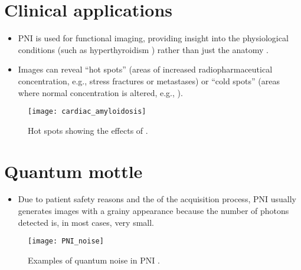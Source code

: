 \section{Clinical applications}
\begin{itemize}
\item PNI is used for functional imaging, providing insight into the
  physiological conditions (such as hyperthyroidism
  \cite{abdulla2025molecular_imaging}) rather than just the anatomy
  \cite{bushberg2011essential}.
\item Images can reveal ``hot spots'' (areas of increased
  radiopharmaceutical concentration, e.g., stress fractures or
  metastases) or ``cold spots'' (areas where normal concentration is
  altered, e.g., ).
\end{itemize}
\vspace{-1ex}
\begin{figure}[H]
  \centering
  \texttt{[image: cardiac\_amyloidosis]}
  \caption{Hot spots showing the effects of 
    \cite{MNT_effects_cardiac_amyloidosis}.\label{fig:hot_spots}}
\end{figure}

\section{Quantum mottle}
\begin{itemize}
\item Due to patient safety reasons and the  of the
  acquisition process, PNI usually generates images with a grainy
  appearance because the number of photons detected is, in most cases,
  very small.
\end{itemize}
\vspace{-1ex}
\begin{figure}[H]
  \centering
  \texttt{[image: PNI\_noise]}
  \caption{Examples of quantum noise in \gls{PNI}
    \cite{saridin2007quantitative}.}
  \label{PNI_noise}
\end{figure}

